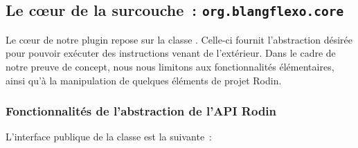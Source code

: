 \subsection{Le cœur de la surcouche~: \texttt{org.blangflexo.core}}

Le cœur de notre plugin repose sur la classe .
Celle-ci fournit l'abstraction désirée pour pouvoir exécuter des instructions venant de l'extérieur.
Dans le cadre de notre preuve de concept, nous nous limitons aux fonctionnalités élémentaires, ainsi qu'à la manipulation de quelques éléments de projet Rodin.

\subsubsection{Fonctionnalités de l'abstraction de l'API Rodin}

L'interface publique de la classe  est la suivante~:

